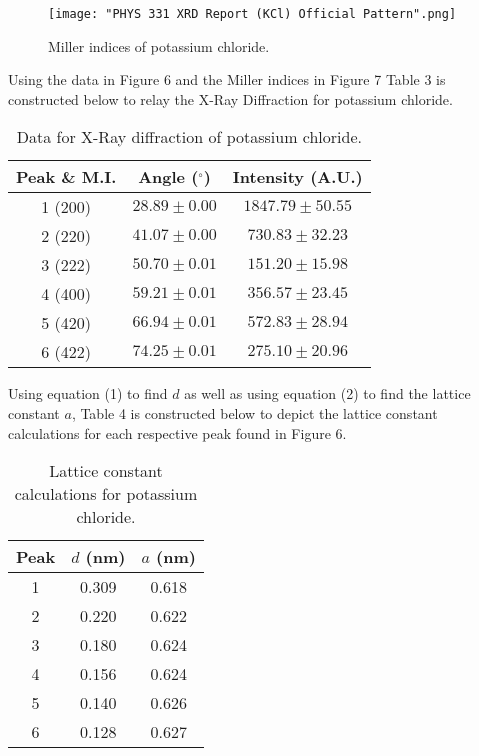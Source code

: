 \documentclass[twocolumn]{article}
\begin{document}
\begin{figure}[htbp]
\begin{center}
\texttt{[image: "PHYS 331 XRD Report (KCl) Official Pattern".png]}
\caption{Miller indices of potassium chloride.}
\label{default}
\end{center}
\end{figure}
\newline
Using the data in Figure 6 and the Miller indices in Figure 7 Table 3 is constructed below to relay the X-Ray Diffraction for potassium chloride.
\begin{table}[htp]
\begin{center}
\begin{tabular}{|c|c|c|}
	\hline \small{\textbf{Peak \& M.I.}} & \small{\textbf{Angle ($^{\circ}$)}} & \small{\textbf{Intensity (A.U.)}} \\ \hline
	1 (200)& $28.89\pm0.00$ & $1847.79\pm50.55$ \\ \hline
	2 (220)& $41.07\pm0.00$ & $730.83\pm32.23$ \\ \hline
	3 (222)& $50.70\pm0.01$ & $151.20\pm15.98$ \\ \hline
	4 (400)& $59.21\pm0.01$ & $356.57\pm23.45$ \\ \hline
	5 (420)& $66.94\pm0.01$ & $572.83\pm28.94$ \\ \hline
	6 (422)& $74.25\pm0.01$ & $275.10\pm20.96$ \\ \hline
\end{tabular}
\caption{Data for X-Ray diffraction of potassium chloride.}
\end{center}
\label{default}
\end{table}%
\newline
Using equation (1) to find $d$ as well as using equation (2) to find the lattice constant $a$, Table 4 is constructed below to depict the lattice constant calculations for each respective peak found in Figure 6.
\begin{table}[htp]
\begin{center}
\begin{tabular}{|c|c|c|}
	\hline \small\textbf{{Peak}} &\small{\textbf{$d$ (nm)}} & \small{\textbf{$a$ (nm)}} \\ \hline
	1 & 0.309 & 0.618 \\ \hline
	2 & 0.220 & 0.622 \\ \hline
	3 & 0.180 & 0.624 \\ \hline
	4 & 0.156 & 0.624 \\ \hline
	5 & 0.140 & 0.626 \\ \hline
	6 & 0.128 & 0.627 \\ \hline
\end{tabular}
\caption{Lattice constant calculations for potassium chloride.}
\end{center}
\label{default}
\end{table}%
\end{document}
